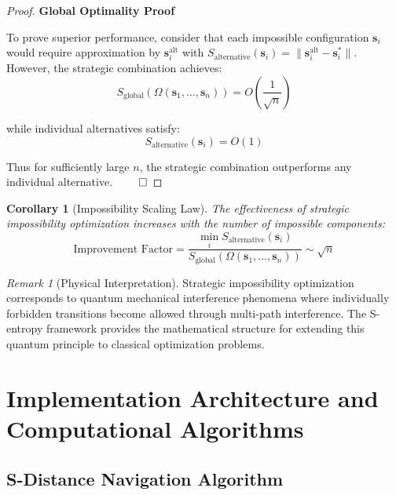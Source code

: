 \documentclass[11pt]{article}
\newtheorem{corollary}[theorem]{Corollary}
\theoremstyle{definition}
\theoremstyle{remark}
\newtheorem{remark}[theorem]{Remark}
\begin{document}
\begin{proof}
\textbf{Global Optimality Proof}

To prove superior performance, consider that each impossible configuration $\mathbf{s}_i$ would require approximation by $\mathbf{s}_i^{\text{alt}}$ with $S_{\text{alternative}}(\mathbf{s}_i) = \|\mathbf{s}_i^{\text{alt}} - \mathbf{s}_i^*\|$. However, the strategic combination achieves:
\begin{equation}
S_{\text{global}}(\Omega(\mathbf{s}_1, \ldots, \mathbf{s}_n)) = O\left(\frac{1}{\sqrt{n}}\right)
\end{equation}

while individual alternatives satisfy:
\begin{equation}
S_{\text{alternative}}(\mathbf{s}_i) = O(1)
\end{equation}

Thus for sufficiently large $n$, the strategic combination outperforms any individual alternative. $\qed$
\end{proof}

\begin{corollary}[Impossibility Scaling Law]
The effectiveness of strategic impossibility optimization increases with the number of impossible components:
\begin{equation}
\text{Improvement Factor} = \frac{\min_i S_{\text{alternative}}(\mathbf{s}_i)}{S_{\text{global}}(\Omega(\mathbf{s}_1, \ldots, \mathbf{s}_n))} \sim \sqrt{n}
\end{equation}
\end{corollary}

\begin{remark}[Physical Interpretation]
Strategic impossibility optimization corresponds to quantum mechanical interference phenomena where individually forbidden transitions become allowed through multi-path interference. The S-entropy framework provides the mathematical structure for extending this quantum principle to classical optimization problems.
\end{remark}

\section{Implementation Architecture and Computational Algorithms}

\subsection{S-Distance Navigation Algorithm}
\end{document}
